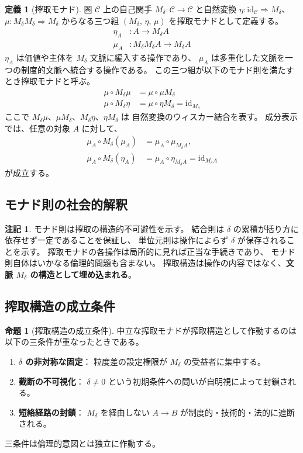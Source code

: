 \documentclass[11pt,a4paper]{ltjsarticle}
\newcommand{\Mdelta}{M_\delta}
\newcommand{\id}{\mathrm{id}}
\theoremstyle{definition}
\newtheorem{definition}{定義}[section]
\newtheorem{proposition}{命題}[section]
\newtheorem{remark}{注記}[section]
\begin{document}
\begin{definition}[搾取モナド]
圏 $\mathcal{C}$ 上の自己関手
$\Mdelta: \mathcal{C} \to \mathcal{C}$ と自然変換
$\eta: \id_{\mathcal{C}} \Rightarrow \Mdelta$、
$\mu: \Mdelta\Mdelta \Rightarrow \Mdelta$ からなる三つ組
$(\Mdelta,\, \eta,\, \mu)$ を搾取モナドとして定義する。
\begin{align}
\eta_A &: A \to \Mdelta A \\
\mu_A &: \Mdelta\Mdelta A \to \Mdelta A
\end{align}
$\eta_A$ は価値や主体を $\Mdelta$ 文脈に編入する操作であり、
$\mu_A$ は多重化した文脈を一つの制度的文脈へ統合する操作である。
この三つ組が以下のモナド則を満たすとき搾取モナドと呼ぶ。
\begin{align}
\mu \circ \Mdelta\mu &= \mu \circ \mu\Mdelta \\
\mu \circ \Mdelta\eta &= \mu \circ \eta\Mdelta = \id_{\Mdelta}
\end{align}
ここで $\Mdelta\mu$、$\mu\Mdelta$、$\Mdelta\eta$、$\eta\Mdelta$ は
自然変換のウィスカー結合を表す。
成分表示では、任意の対象 $A$ に対して、
\begin{align}
\mu_A \circ \Mdelta(\mu_A)
  &= \mu_A \circ \mu_{\Mdelta A},\\
\mu_A \circ \Mdelta(\eta_A)
  &= \mu_A \circ \eta_{\Mdelta A}
  = \id_{\Mdelta A}
\end{align}
が成立する。
\end{definition}

\subsection{モナド則の社会的解釈}

\begin{remark}
モナド則は搾取の構造的不可避性を示す。
結合則は $\delta$ の累積が括り方に依存せず一定であることを保証し、
単位元則は操作によらず $\delta$ が保存されることを示す。
搾取モナドの各操作は局所的に見れば正当な手続きであり、
モナド則自体はいかなる倫理的問題も含まない。
搾取構造は操作の内容ではなく、\textbf{文脈 $\Mdelta$ の構造として埋め込まれる}。
\end{remark}

\subsection{搾取構造の成立条件}

\begin{proposition}[搾取構造の成立条件]
中立な搾取モナドが搾取構造として作動するのは以下の三条件が重なったときである。
\begin{enumerate}
\item \textbf{$\delta$ の非対称な固定}：
  粒度差の設定権限が $\Mdelta$ の受益者に集中する。
\item \textbf{截断の不可視化}：
  $\delta \neq 0$ という初期条件への問いが自明視によって封鎖される。
\item \textbf{短絡経路の封鎖}：
  $\Mdelta$ を経由しない $A \to B$ が制度的・技術的・法的に遮断される。
\end{enumerate}
三条件は倫理的意図とは独立に作動する。
\end{proposition}
\end{document}
